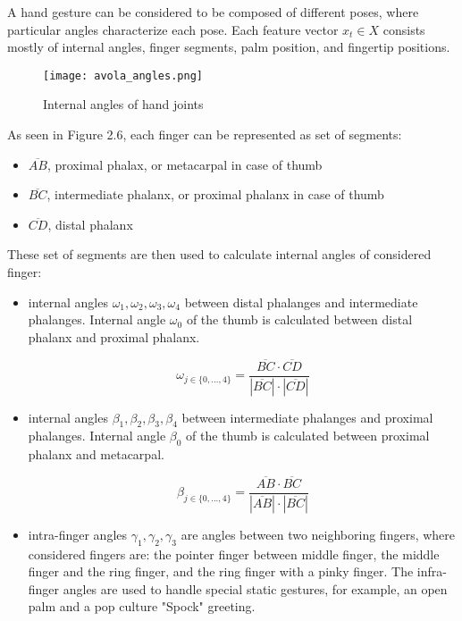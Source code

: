 A hand gesture can be considered to be composed of different poses, where particular angles characterize each pose. Each feature vector $x_t \in X$ consists mostly of internal angles, finger segments, palm position, and fingertip positions.

\begin{figure}[ht]
	\centering
    \texttt{[image: avola\_angles.png]}
	\caption{Internal angles of hand joints \cite{avola}}
	\label{fig:lstm_angles}
\end{figure}

As seen in Figure 2.6, each finger can be represented as set of segments:
\begin{itemize}
	\item $\overline{AB}$, proximal phalax, or metacarpal in case of thumb
	\item $\overline{BC}$, intermediate phalanx, or proximal phalanx in case of thumb
	\item $\overline{CD}$, distal phalanx
\end{itemize}

These set of segments are then used to calculate internal angles of considered finger:
\begin{itemize}
    \item internal angles $\omega_1, \omega_2, \omega_3, \omega_4$ between distal phalanges and intermediate phalanges. Internal angle $\omega_0$ of the thumb is calculated between distal phalanx and proximal phalanx.
	
	\begin{equation}
		{\omega_{j \in \{0, ..., 4\}} = \frac{\overline{BC} \cdot \overline{CD}}{|\overline{BC}| \cdot |\overline{CD}|}}
	\end{equation}

    \item internal angles $\beta_1, \beta_2, \beta_3, \beta_4$ between intermediate phalanges and proximal phalanges. Internal angle $\beta_0$ of the thumb is calculated between proximal phalanx and metacarpal.
	
	\begin{equation}
		{\beta_{j \in \{0, ..., 4\}} = \frac{\overline{AB} \cdot \overline{BC}}{|\overline{AB}| \cdot |\overline{BC}|}}
	\end{equation}
	
    \item intra-finger angles $\gamma_1, \gamma_2, \gamma_3$ are angles between two neighboring fingers, where considered fingers are: the pointer finger between middle finger, the middle finger and the ring finger, and the ring finger with a pinky finger. The infra-finger angles are used to handle special static gestures,  for example, an open palm and a pop culture "Spock" greeting.
\end{itemize}


